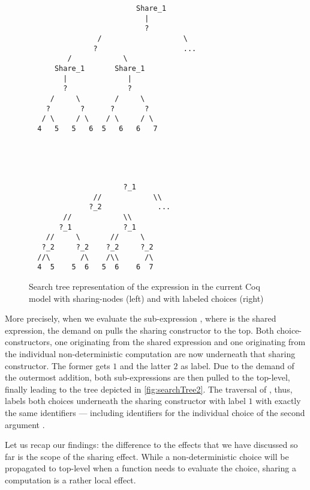 \begin{figure}[h]
\begin{minipage}{0.50\textwidth}
 \centering
\begin{BVerbatim}
                         Share_1
                           |
                           ?
                /                   \
               ?                    ...
         /            \
      Share_1       Share_1
        |              |
        ?              ?
     /     \        /     \
    ?       ?      ?       ?
   / \     / \    / \     / \
  4   5   5   6  5   6   6   7
\end{BVerbatim}
\end{minipage}
\begin{minipage}{0.49\textwidth}
\centering
\begin{BVerbatim}



  
                      ?_1
               //            \\
              ?_2             ...
        //            \\
       ?_1            ?_1
    //     \       //     \
   ?_2     ?_2    ?_2     ?_2
  //\       /\    /\\      /\
  4  5    5  6   5  6    6  7
\end{BVerbatim}
\end{minipage}
\caption{Search tree representation of the expression 
  in the current Coq model with sharing-nodes (left) and with labeled
  choices (right)}
\label{fig:searchTree2}
\end{figure}

More precisely, when we evaluate the sub-expression , where  is the shared expression, the demand on  pulls the sharing constructor to the top.
Both choice-constructors, one originating from the shared expression  and one originating from the individual non-deterministic computation  are now underneath that sharing constructor.
The former gets $1$ and the latter $2$ as label.
Due to the demand of the outermost addition, both sub-expressions are then pulled to the top-level, finally leading to the tree depicted in \autoref{fig:searchTree2}.
The traversal of , thus, labels both choices underneath the sharing constructor with label $1$ with exactly the same identifiers --- including identifiers for the individual choice of the second argument .

Let us recap our findings: the difference to the effects that we have discussed so far is the scope of the sharing effect.
While a non-deterministic choice will be propagated to top-level when a function needs to evaluate the choice, sharing a computation is a rather local effect.


